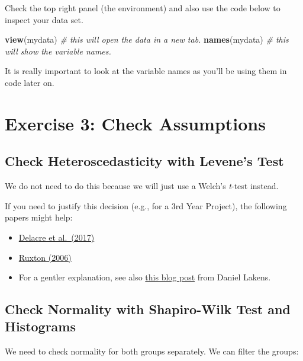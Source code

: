 \documentclass[
]{book}
\newenvironment{Shaded}{\begin{snugshade}}{\end{snugshade}}
\newcommand{\CommentTok}[1]{\textcolor[rgb]{0.56,0.35,0.01}{\textit{#1}}}
\newcommand{\FunctionTok}[1]{\textcolor[rgb]{0.13,0.29,0.53}{\textbf{#1}}}
\newcommand{\NormalTok}[1]{#1}
\let\oldsection\section
\renewcommand{\section}{\needspace{5\baselineskip}\oldsection}
\let\oldsubsection\subsection
\renewcommand{\subsection}{\needspace{3\baselineskip}\oldsubsection}  %
\begin{document}
Check the top right panel (the environment) and also use the code below to inspect your data set.

\begin{Shaded}
\begin{Highlighting}[]
\FunctionTok{view}\NormalTok{(mydata) }\CommentTok{\# this will open the data in a new tab.}
\FunctionTok{names}\NormalTok{(mydata) }\CommentTok{\# this will show the variable names.}
\end{Highlighting}
\end{Shaded}

It is really important to look at the variable names as you'll be using them in code later on.

\section{Exercise 3: Check Assumptions}\label{exercise-3-check-assumptions}

\subsection{Check Heteroscedasticity with Levene's Test}\label{check-heteroscedasticity-with-levenes-test}

We do not need to do this because we will just use a Welch's \emph{t}-test instead.

If you need to justify this decision (e.g., for a 3rd Year Project), the following papers might help:

\begin{itemize}
\item
  \href{https://rips-irsp.com/articles/10.5334/irsp.82}{Delacre et al.~(2017)}
\item
  \href{https://academic.oup.com/beheco/article/17/4/688/215960}{Ruxton (2006)}
\item
  For a gentler explanation, see also \href{https://daniellakens.blogspot.com/2015/01/always-use-welchs-t-test-instead-of.html}{this blog post} from Daniel Lakens.
\end{itemize}

\subsection{Check Normality with Shapiro-Wilk Test and Histograms}\label{check-normality-with-shapiro-wilk-test-and-histograms}

We need to check normality for both groups separately. We can filter the groups:
\end{document}
